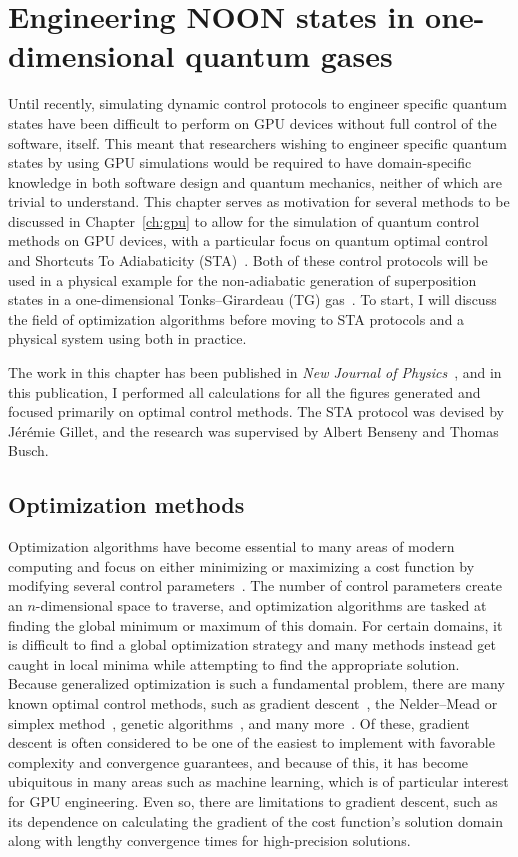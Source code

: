 \chapter{Engineering NOON states in one-dimensional quantum gases}
\label{ch:1d}

Until recently, simulating dynamic control protocols to engineer specific quantum states have been difficult to perform on GPU devices without full control of the software, itself.
This meant that researchers wishing to engineer specific quantum states by using GPU simulations would be required to have domain-specific knowledge in both software design and quantum mechanics, neither of which are trivial to understand.
This chapter serves as motivation for several methods to be discussed in Chapter~\ref{ch:gpu} to allow for the simulation of quantum control methods on GPU devices, with a particular focus on quantum optimal control~\cite{werschnik2007} and Shortcuts To Adiabaticity (STA)~\cite{guery2019}.
Both of these control protocols will be used in a physical example for the non-adiabatic generation of superposition states in a one-dimensional Tonks--Girardeau (TG) gas~\cite{schloss2016}.
To start, I will discuss the field of optimization algorithms before moving to STA protocols and a physical system using both in practice.

The work in this chapter has been published in \textit{New Journal of Physics}~\cite{schloss2016}, and in this publication, I performed all calculations for all the figures generated and focused primarily on optimal control methods.
The STA protocol was devised by J\'er\'emie Gillet, and the research was supervised by Albert Benseny and Thomas Busch.

\section{Optimization methods}

Optimization algorithms have become essential to many areas of modern computing and focus on either minimizing or maximizing a cost function by modifying several control parameters~\cite{lewis2012}.
The number of control parameters create an $n$-dimensional space to traverse, and optimization algorithms are tasked at finding the global minimum or maximum of this domain.
For certain domains, it is difficult to find a global optimization strategy and many methods instead get caught in local minima while attempting to find the appropriate solution.
Because generalized optimization is such a fundamental problem, there are many known optimal control methods, such as gradient descent~\cite{ruder2016}, the Nelder--Mead or simplex method~\cite{nelder1965}, genetic algorithms~\cite{koza1997}, and many more~\cite{lewis2012}.
Of these, gradient descent is often considered to be one of the easiest to implement with favorable complexity and convergence guarantees, and because of this, it has become ubiquitous in many areas such as machine learning, which is of particular interest for GPU engineering. 
Even so, there are limitations to gradient descent, such as its dependence on calculating the gradient of the cost function's solution domain along with lengthy convergence times for high-precision solutions.

